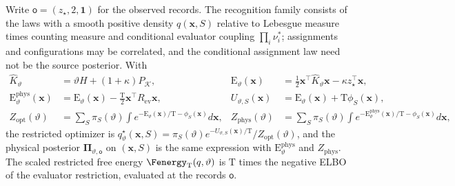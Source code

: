 Write \(\mathsf o=(z_\star,2,\mathbf 1)\) for the observed records. The
recognition family consists of the laws with a smooth positive density
\(q(\mathbf x,S)\) relative to Lebesgue measure times counting measure and
conditional evaluator coupling \(\prod_i\nu_i^*\); assignments and
configurations may be correlated, and the conditional assignment law need not
be the source posterior. With
\begin{equation}
\begin{aligned}
\widehat K_\vartheta&=\vartheta H+(1+\kappa)P_{\mathcal K},&
\mathrm E_\vartheta(\mathbf x)&=\tfrac12\mathbf x^\top\widehat K_\vartheta\mathbf x
                  -\kappa z_\star^\top\mathbf x,\\
\mathrm E_\vartheta^{\mathrm{phys}}(\mathbf x)
   &=\mathrm E_\vartheta(\mathbf x)-\tfrac{\mathrm T}2\mathbf x^\top R_{\mathrm{ev}}\mathbf x,&
U_{\vartheta,S}(\mathbf x)&=\mathrm E_\vartheta(\mathbf x)+\mathrm T\phi_S(\mathbf x),\\
Z_{\mathrm{opt}}(\vartheta)
   &=\sum_S\pi_S(\vartheta)
      \int e^{-\mathrm E_\vartheta(\mathbf x)/\mathrm T-\phi_S(\mathbf x)}d\mathbf x,&
Z_{\mathrm{phys}}(\vartheta)
   &=\sum_S\pi_S(\vartheta)
      \int e^{-\mathrm E_\vartheta^{\mathrm{phys}}(\mathbf x)/\mathrm T-\phi_S(\mathbf x)}d\mathbf x,
\end{aligned}
\label{eq:rg-formation-partition-integrals}
\end{equation}
the restricted optimizer is
\(q^\star_\vartheta(\mathbf x,S)=\pi_S(\vartheta)e^{-U_{\vartheta,S}(\mathbf x)/\mathrm T}
/Z_{\mathrm{opt}}(\vartheta)\), and the physical posterior
\(\boldsymbol\Pi_{\vartheta,\mathsf o}\) on \((\mathbf x,S)\) is the same
expression with \(\mathrm E_\vartheta^{\mathrm{phys}}\) and
\(Z_{\mathrm{phys}}\). The scaled restricted free energy
\(\Fenergy_{\mathrm T}(q,\vartheta)\) is \(\mathrm T\) times the negative ELBO
of the evaluator restriction, evaluated at the records \(\mathsf o\).

